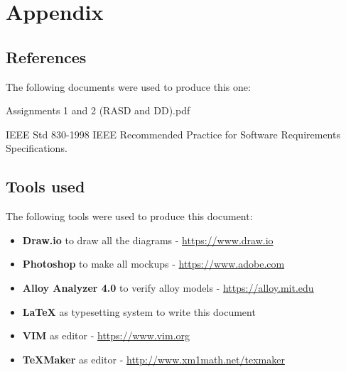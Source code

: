 \pagebreak
\section{Appendix}

\subsection*{References}
The following documents were used to produce this one:
\begingroup
    \renewcommand{\section}[2]{}%
    \begin{thebibliography}{9}
        Assignments 1 and 2 (RASD and DD).pdf

        IEEE Std 830-1998 IEEE Recommended Practice for Software Requirements
        Specifications.
    \end{thebibliography}
\endgroup

\subsection*{Tools used}
The following tools were used to produce this document:
\begin{itemize}
    \item \textbf{Draw.io} to draw all the diagrams - \url{https://www.draw.io}
    \item \textbf{Photoshop} to make all mockups - \url{https://www.adobe.com}
    \item \textbf{Alloy Analyzer 4.0} to verify alloy models - \url{https://alloy.mit.edu}
    \item \textbf{LaTeX} as typesetting system to write this document
    \item \textbf{VIM} as editor - \url{https://www.vim.org}
    \item \textbf{TeXMaker} as editor - \url{http://www.xm1math.net/texmaker}
\end{itemize}
